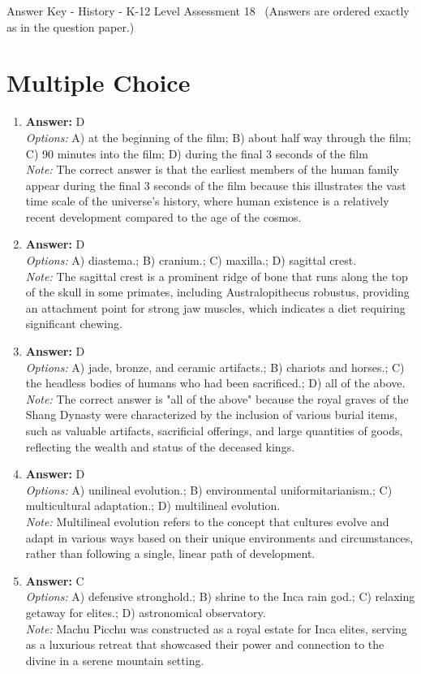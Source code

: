 \documentclass[12pt]{article}
\begin{document}
\begin{center}
Answer Key - History - K-12 Level Assessment 18 \
\small (Answers are ordered exactly as in the question paper.)
\end{center}

\section*{Multiple Choice}
\begin{enumerate}[label=\arabic*.]
\item \textbf{Answer:} D
\\ \textit{Options:} A) at the beginning of the film; B) about half way through the film; C) 90 minutes into the film; D) during the final 3 seconds of the film
\\ \textit{Note:} The correct answer is that the earliest members of the human family appear during the final 3 seconds of the film because this illustrates the vast time scale of the universe's history, where human existence is a relatively recent development compared to the age of the cosmos.
\item \textbf{Answer:} D
\\ \textit{Options:} A) diastema.; B) cranium.; C) maxilla.; D) sagittal crest.
\\ \textit{Note:} The sagittal crest is a prominent ridge of bone that runs along the top of the skull in some primates, including Australopithecus robustus, providing an attachment point for strong jaw muscles, which indicates a diet requiring significant chewing.
\item \textbf{Answer:} D
\\ \textit{Options:} A) jade, bronze, and ceramic artifacts.; B) chariots and horses.; C) the headless bodies of humans who had been sacrificed.; D) all of the above.
\\ \textit{Note:} The correct answer is "all of the above" because the royal graves of the Shang Dynasty were characterized by the inclusion of various burial items, such as valuable artifacts, sacrificial offerings, and large quantities of goods, reflecting the wealth and status of the deceased kings.
\item \textbf{Answer:} D
\\ \textit{Options:} A) unilineal evolution.; B) environmental uniformitarianism.; C) multicultural adaptation.; D) multilineal evolution.
\\ \textit{Note:} Multilineal evolution refers to the concept that cultures evolve and adapt in various ways based on their unique environments and circumstances, rather than following a single, linear path of development.
\item \textbf{Answer:} C
\\ \textit{Options:} A) defensive stronghold.; B) shrine to the Inca rain god.; C) relaxing getaway for elites.; D) astronomical observatory.
\\ \textit{Note:} Machu Picchu was constructed as a royal estate for Inca elites, serving as a luxurious retreat that showcased their power and connection to the divine in a serene mountain setting.
\end{enumerate}
\end{document}
